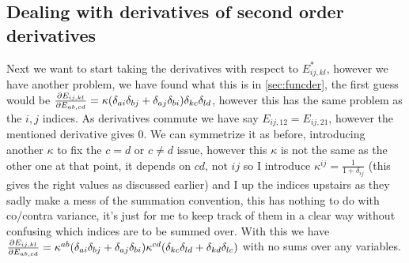 \documentclass[11pt]{article}
\begin{document}
\subsection{Dealing with derivatives of second order derivatives}
Next we want to start taking the derivatives with respect to $E_{ij,kl}^*$, however we have another problem, we have found what this is in \cref{sec:funcder}, the first guess would be $\pdv{E_{ij,kl}}{E_{ab,cd}}=\kappa(\delta_{ai}\delta_{bj} + \delta_{aj}\delta_{bi})\delta_{kc}\delta_{ld}$, however this has the same problem as the $i,j$ indices.
As derivatives commute we have say $E_{ij,12}=E_{ij,21}$, however the mentioned derivative gives 0.
We can symmetrize it as before, introducing another $\kappa$ to fix the $c=d$ or $c\neq d$ issue, however this $\kappa$ is not the same as the other one at that point, it depends on $cd$, not $ij$ so I introduce $\kappa^{ij}=\frac{1}{1+\delta_{ij}}$ (this gives the right values as discussed earlier) and I up the indices upstairs as they sadly make a mess of the summation convention, this has nothing to do with co/contra variance, it's just for me to keep track of them in a clear way without confusing which indices are to be summed over.
With this we have $\pdv{E_{ij,kl}}{E_{ab,cd}}=\kappa^{ab}(\delta_{ai}\delta_{bj} + \delta_{aj}\delta_{bi})\kappa^{cd}(\delta_{kc}\delta_{ld} + \delta_{kd}\delta_{lc})$ with no sums over any variables.
\end{document}
